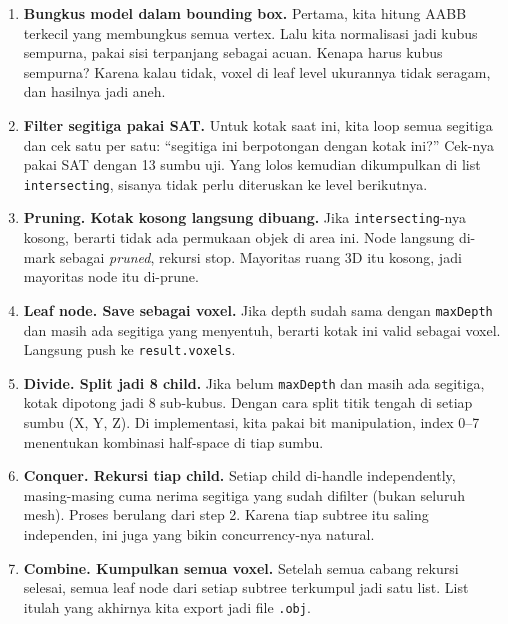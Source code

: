 \documentclass[11pt,a4paper]{article}
\begin{document}
\begin{enumerate}
    \item \textbf{Bungkus model dalam bounding box.}
    Pertama, kita hitung AABB terkecil yang membungkus semua vertex. Lalu kita normalisasi
    jadi kubus sempurna, pakai sisi terpanjang sebagai acuan. Kenapa harus kubus sempurna?
    Karena kalau tidak, voxel di leaf level ukurannya tidak seragam, dan hasilnya jadi aneh.

    \item \textbf{Filter segitiga pakai SAT.}
    Untuk kotak saat ini, kita loop semua segitiga dan cek satu per satu: ``segitiga ini
    berpotongan dengan kotak ini?'' Cek-nya pakai SAT dengan 13 sumbu uji. Yang lolos
    kemudian dikumpulkan di list \texttt{intersecting}, sisanya tidak perlu diteruskan ke level
    berikutnya.

    \item \textbf{Pruning. Kotak kosong langsung dibuang.}
    Jika \texttt{intersecting}-nya kosong, berarti tidak ada permukaan objek di area ini.
    Node langsung di-mark sebagai \textit{pruned}, rekursi stop. Mayoritas ruang 3D itu
    kosong, jadi mayoritas node itu di-prune.

    \item \textbf{Leaf node. Save sebagai voxel.}
    Jika depth sudah sama dengan \texttt{maxDepth} dan masih ada segitiga yang menyentuh,
    berarti kotak ini valid sebagai voxel. Langsung push ke \texttt{result.voxels}.

    \item \textbf{Divide. Split jadi 8 child.}
    Jika belum \texttt{maxDepth} dan masih ada segitiga, kotak dipotong jadi 8 sub-kubus.
    Dengan cara split titik tengah di setiap sumbu (X, Y, Z). Di implementasi, kita pakai
    bit manipulation, index 0--7 menentukan kombinasi half-space di tiap sumbu.

    \item \textbf{Conquer. Rekursi tiap child.}
    Setiap child di-handle independently, masing-masing cuma nerima segitiga yang sudah
    difilter (bukan seluruh mesh). Proses berulang dari step 2. Karena tiap subtree
    itu saling independen, ini juga yang bikin concurrency-nya natural.

    \item \textbf{Combine. Kumpulkan semua voxel.}
    Setelah semua cabang rekursi selesai, semua leaf node dari setiap subtree terkumpul
    jadi satu list. List itulah yang akhirnya kita export jadi file \texttt{.obj}.
\end{enumerate}
\end{document}
